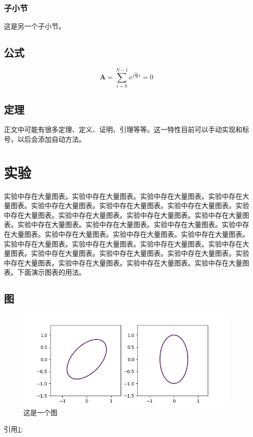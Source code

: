 \documentclass[12pt]{article} %
\begin{document}
\subsubsection{子小节}
这是另一个子小节。

\subsection{公式}
\begin{equation}
\label{eqn:eqn1}
\mathbf{A}=\sum\limits_{i=0}^{N-1}{e^{j\frac{2\pi}{N}i}}=0
\end{equation}

\subsection{定理}
正文中可能有很多定理、定义、证明、引理等等。这一特性目前可以手动实现和标号，以后会添加自动方法。


\section{实验}
实验中存在大量图表。实验中存在大量图表。实验中存在大量图表。实验中存在大量图表。实验中存在大量图表。实验中存在大量图表。实验中存在大量图表。实验中存在大量图表。实验中存在大量图表。实验中存在大量图表。实验中存在大量图表。实验中存在大量图表。实验中存在大量图表。实验中存在大量图表。实验中存在大量图表。实验中存在大量图表。实验中存在大量图表。实验中存在大量图表。实验中存在大量图表。实验中存在大量图表。实验中存在大量图表。实验中存在大量图表。实验中存在大量图表。实验中存在大量图表。实验中存在大量图表。实验中存在大量图表。实验中存在大量图表。实验中存在大量图表。实验中存在大量图表。下面演示图表的用法。

\subsection{图}
\begin{figure}[ht]
\centering
\includegraphics[width=\textwidth]{canoform.png}
\caption{这是一个图}
\label{fig:fig1}
\end{figure}
引用\ref{fig:fig1};
\end{document}
